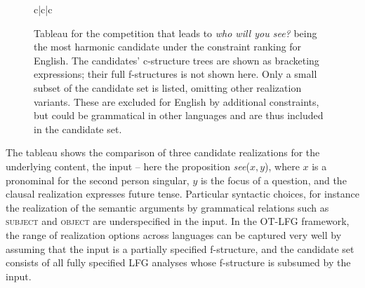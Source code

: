\documentclass[output=paper,hidelinks]{langscibook}
\begin{document}
\begin{figure}
\ShadingOn
\begin{tableau}{c|c|c}
      
 \vio{*!} \vio{} \vio{}
  \vio{} \vio{*!} \vio{*}
 \vio{} \vio{} \vio{**}
\end{tableau}
\caption{Tableau for the competition that leads to \emph{who will you see?} being the most harmonic candidate under the constraint ranking for English. The candidates' c-structure trees are shown as bracketing expressions; their full f-structures is not shown here. Only a small subset of the candidate set is listed, omitting other realization variants. These are excluded for English by additional constraints, but could be grammatical in other languages and are thus included in the candidate set.}
\label{fig:tableau1}
\end{figure}

The tableau shows the comparison of three candidate realizations for the underlying content, the input -- here the proposition \emph{see}($x, y$), where $x$ is a pronominal for the second person singular, $y$ is the focus of a question, and the clausal realization expresses future tense. Particular syntactic choices, for instance the realization of the semantic arguments by grammatical relations such as \textsc{subject} and \textsc{object} are underspecified in the input. In the OT-LFG framework, the range of realization options across languages can be captured very well by assuming that the input is a partially specified f-structure, and the candidate set consists of all fully specified LFG analyses whose f-structure is subsumed by the input.
\end{document}
